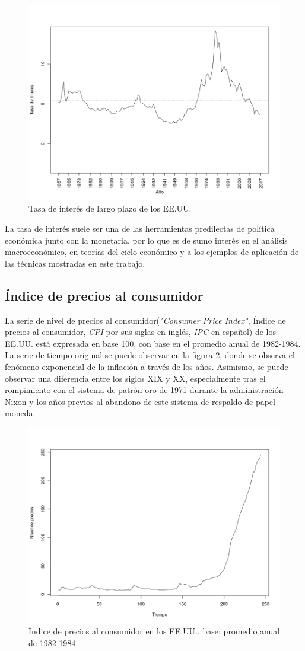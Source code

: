 \documentclass[a4paper]{article}
\begin{document}
\begin{figure}[H]
	\centering
	\includegraphics[width=0.75\linewidth]{ir_orig.png}
	\caption{Tasa de interés de largo plazo de los EE.UU.}
	\label{fig:ir_orig}
\end{figure}

La tasa de interés suele ser una de las herramientas predilectas de política económica junto con la monetaria, por lo que es de sumo interés en el análisis macroeconómico, en teorías del ciclo económico y a los ejemplos de aplicación de las técnicas mostradas en este trabajo.

\subsection{Índice de precios al consumidor}
La serie de nivel de precios al consumidor(\textit{"Consumer Price Index"}, Índice de precios al consumidor, \textit{CPI} por sus siglas en inglés, \textit{IPC} en español) de los EE.UU. está expresada en base 100, con base en el promedio anual de 1982-1984. La serie de tiempo original se puede observar en la figura \ref{fig:cpi_orig}, donde se observa el fenómeno exponencial de la inflación a través de los años. Asimismo, se puede observar una diferencia entre los siglos XIX y XX, especialmente tras el rompimiento con el sistema de patrón oro de 1971 durante la administración Nixon y los años previos al abandono de este sistema de respaldo de papel moneda.

\begin{figure}[H]
	\centering
	\includegraphics[width=0.8\linewidth]{cpi_orig.png}
	\caption{Índice de precios al consumidor en los EE.UU., base: promedio anual de 1982-1984} 	
	\label{fig:cpi_orig}
\end{figure}
\end{document}
